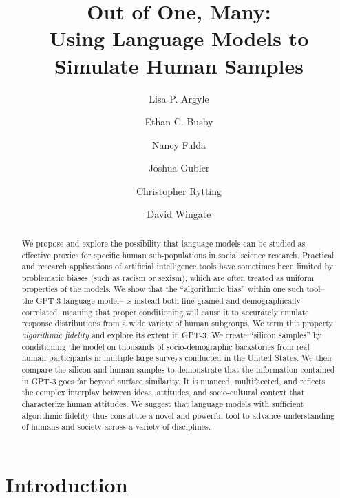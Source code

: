 \documentclass[11pt]{article}
\title{Out of One, Many:\\Using Language Models to Simulate Human Samples}
\author[1]{Lisa P. Argyle}
\author[1]{Ethan C. Busby}
\author[2]{Nancy Fulda}
\author[1]{Joshua Gubler}
\author[2]{Christopher Rytting}
\author[2]{David Wingate}
\affil[1]{Department of Political Science, Brigham Young University}
\affil[2]{Department of Computer Science, Brigham Young University}
\begin{document}
\maketitle

\begin{abstract}
We propose and explore the possibility that language models can be studied as effective proxies for specific human sub-populations in social science research. Practical and research applications of artificial intelligence tools have sometimes been limited by problematic biases (such as racism or sexism), which are often treated as uniform properties of the models. We show that the “algorithmic bias” within one such tool-- the GPT-3 language model-- is instead both fine-grained and demographically correlated, meaning that proper conditioning will cause it to accurately emulate response distributions from a wide variety of human subgroups.  We term this property \textit{algorithmic fidelity} and explore its extent in GPT-3. We create ``silicon samples'' by conditioning the model on thousands of socio-demographic backstories from real human participants in multiple large surveys conducted in the United States. We then compare the silicon and human samples to demonstrate that the information contained in GPT-3 goes far beyond surface similarity. It is nuanced, multifaceted, and reflects the complex interplay between ideas, attitudes, and socio-cultural context that characterize human attitudes.  We suggest that language models with sufficient algorithmic fidelity thus constitute a novel and powerful tool to advance understanding of humans and society across a variety of disciplines.

\end{abstract}

\tableofcontents


\parindent 0.0in
\parskip 0.15in

\section{Introduction}
\end{document}
